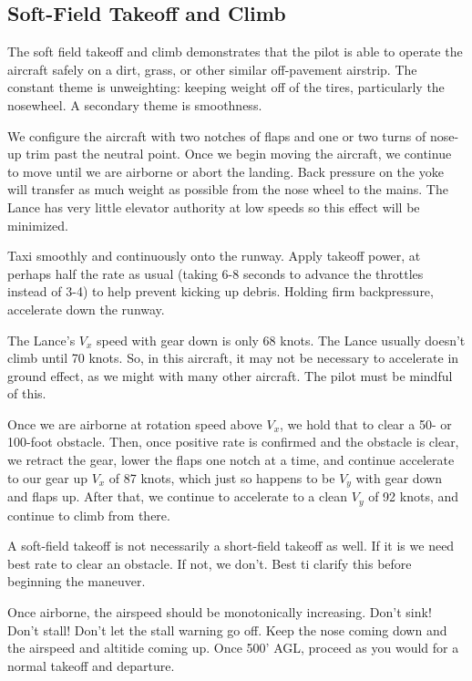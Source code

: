 \subsection{Soft-Field Takeoff and Climb}

The soft field takeoff and climb demonstrates that the pilot is able to operate the aircraft safely on a dirt, grass, or other similar off-pavement airstrip. The constant theme is unweighting: keeping weight off of the tires, particularly the nosewheel. A secondary theme is smoothness.

We configure the aircraft with two notches of flaps and one or two turns of nose-up trim past the neutral point. Once we begin moving the aircraft, we continue to move until we are airborne or abort the landing. Back pressure on the yoke will transfer as much weight as possible from the nose wheel to the mains. The Lance has very little elevator authority at low speeds so this effect will be minimized.

Taxi smoothly and continuously onto the runway. Apply takeoff power, at perhaps half the rate as usual (taking 6-8 seconds to advance the throttles instead of 3-4) to help prevent kicking up debris. Holding firm backpressure, accelerate down the runway.

The Lance's $V_x$ speed with gear down is only 68 knots. The Lance usually doesn't climb until 70 knots. So, in this aircraft, it may not be necessary to accelerate in ground effect, as we might with many other aircraft. The pilot must be mindful of this.

Once we are airborne at rotation speed above $V_x$, we hold that to clear a 50- or 100-foot obstacle. Then, once positive rate is confirmed and the obstacle is clear, we retract the gear, lower the flaps one notch at a time, and continue accelerate to our gear up $V_x$ of 87 knots, which just so happens to be $V_y$ with gear down and flaps up. After that, we continue to accelerate to a clean $V_y$ of 92 knots, and continue to climb from there.

A soft-field takeoff is not necessarily a short-field takeoff as well. If it is we need best rate to clear an obstacle. If not, we don't. Best ti clarify this before beginning the maneuver.

Once airborne, the airspeed should be monotonically increasing. Don't sink! Don't stall! Don't let the stall warning go off. Keep the nose coming down and the airspeed and altitide coming up. Once 500' AGL, proceed as you would for a normal takeoff and departure.


